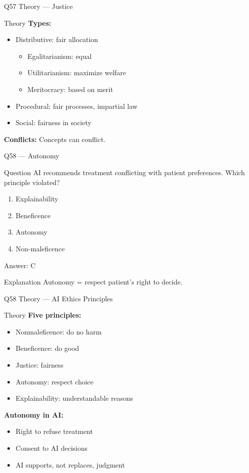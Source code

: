 \documentclass[aspectratio=169,8pt]{beamer}
\begin{document}
	\begin{frame}{Q57 Theory --- Justice}
		\begin{block}{Theory}
			\textbf{Types:}
			\begin{itemize}
				\item Distributive: fair allocation
				\begin{itemize}
					\item Egalitarianism: equal
					\item Utilitarianism: maximize welfare
					\item Meritocracy: based on merit
				\end{itemize}
				\item Procedural: fair processes, impartial law
				\item Social: fairness in society
			\end{itemize}
			\textbf{Conflicts:} Concepts can conflict.
		\end{block}
	\end{frame}
	
	\begin{frame}{Q58 --- Autonomy}
		\begin{block}{Question}
			AI recommends treatment conflicting with patient preferences. Which principle violated?
		\end{block}
		\begin{enumerate}[label=\Alph*.]
			\item Explainability
			\item Beneficence
			\item Autonomy
			\item Non-maleficence
		\end{enumerate}
		\begin{exampleblock}{Answer: C}
		\end{exampleblock}
		\begin{block}{Explanation}
			Autonomy = respect patient's right to decide.
		\end{block}
	\end{frame}
	
	\begin{frame}{Q58 Theory --- AI Ethics Principles}
		\begin{block}{Theory}
			\textbf{Five principles:}
			\begin{itemize}
				\item Nonmaleficence: do no harm
				\item Beneficence: do good
				\item Justice: fairness
				\item Autonomy: respect choice
				\item Explainability: understandable reasons
			\end{itemize}
			\textbf{Autonomy in AI:}
			\begin{itemize}
				\item Right to refuse treatment
				\item Consent to AI decisions
				\item AI supports, not replaces, judgment
			\end{itemize}
		\end{block}
	\end{frame}
	
\end{document}

